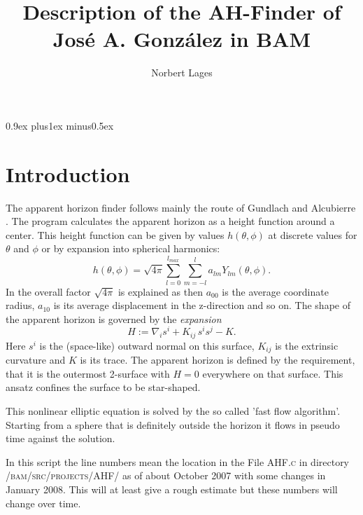 \documentclass[11pt,a4paper,twoside]{article}
\begin{document}
%
\newcommand*\person[1]{\textsc{#1}}
\newcommand*\GansFuss[1]{"`#1"'}
%
\newcommand*\Gam[2]{\ensuremath{\Gamma^{#1}_{#2}}}
\newcommand*\pgam[3]{\ensuremath{\partial_{#1} \gamma^{#2}_{#3}}}
\newcommand*\warningsymbol{\;\Large{\textbf{!}}\;\normalsize}
%
%
\parskip0.9ex plus1ex minus0.5ex
%
%
\title{Description of the AH-Finder of Jos\'e A. Gonz\'alez in BAM}
\author{Norbert Lages}
\maketitle

\section{Introduction}
The apparent horizon finder follows mainly the route of Gundlach
\cite{Gundlach:1997us} and Alcubierre \cite{Alcubierre:1998rq}. 
The program calculates the 
apparent horizon as a height function around a center.
This height function can be given by values $h(\theta,\phi)$ at discrete
values for $\theta$ and $\phi$ or by expansion into spherical harmonics:
\begin{equation}
  h(\theta,\phi) = \sqrt{4\pi} \sum_{l=0}^{l_{max}} 
                  \sum_{m=-l}^{l} a_{lm} Y_{lm}(\theta,\phi).
\end{equation}
In \cite{Alcubierre:1998rq} the overall factor $\sqrt{4\pi}$ is explained 
as then $a_{00}$ is the average coordinate radius, $a_{10}$ is its average 
displacement in the z-direction and so on.
The shape of the apparent horizon is governed by the \emph{expansion}
\begin{equation}
  \label{apphorizonfunction} 
   H:= \nabla_i s^i + K_{ij}\,s^i s^j - K.
\end{equation}
Here $s^i$ is the (space-like) outward normal on this surface, $K_{ij}$ is the
extrinsic curvature and $K$ is its trace. 
The apparent horizon is defined by the requirement, that it is 
the outermost 2-surface with $H=0$ everywhere on that surface.
This ansatz confines the surface to be star-shaped.

This nonlinear elliptic equation is solved by the so called 'fast flow algorithm'.
Starting from a sphere that is definitely outside the horizon it flows
in pseudo time against the solution.

In this script the line numbers mean the location in the File \textsc{AHF.c}
in directory \textsc{/bam/src/projects/AHF/} as of about October 2007 with 
some changes in January 2008. This will at least give a rough estimate but
these numbers will change over time.
\end{document}
